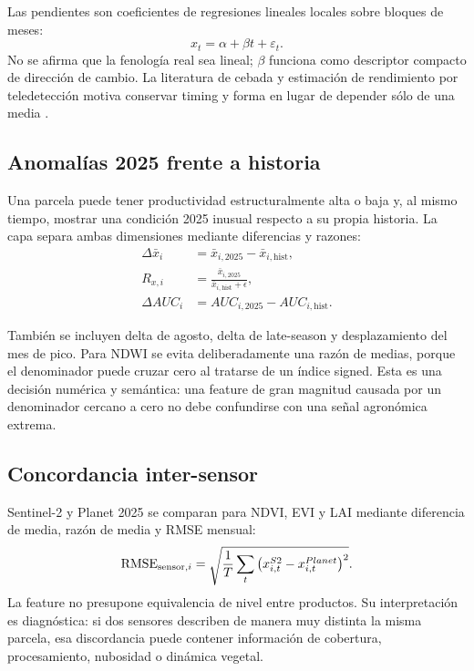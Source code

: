 Las pendientes son coeficientes de regresiones lineales locales sobre bloques de meses:
\[
x_t=\alpha+\beta t+\varepsilon_t.
\]
No se afirma que la fenología real sea lineal; $\beta$ funciona como descriptor compacto de
dirección de cambio. La literatura de cebada y estimación de rendimiento por teledetección
motiva conservar timing y forma en lugar de depender sólo de una media
\citep{Chanev2025,Sharifi2020,Mirosavljevic2018}.

\subsection{Anomalías 2025 frente a historia}

Una parcela puede tener productividad estructuralmente alta o baja y, al mismo tiempo, mostrar
una condición 2025 inusual respecto a su propia historia. La capa separa ambas dimensiones
mediante diferencias y razones:
\begin{align}
\Delta\bar x_i
&=
\bar x_{i,2025}-\bar x_{i,\mathrm{hist}},\\
R_{x,i}
&=
\frac{\bar x_{i,2025}}
{\bar x_{i,\mathrm{hist}}+\epsilon},\\
\Delta AUC_i
&=
AUC_{i,2025}-AUC_{i,\mathrm{hist}}.
\end{align}

También se incluyen delta de agosto, delta de late-season y desplazamiento del mes de pico.
Para NDWI se evita deliberadamente una razón de medias, porque el denominador puede cruzar
cero al tratarse de un índice signed. Esta es una decisión numérica y semántica: una feature
de gran magnitud causada por un denominador cercano a cero no debe confundirse con una señal
agronómica extrema.

\subsection{Concordancia inter-sensor}

Sentinel-2 y Planet 2025 se comparan para NDVI, EVI y LAI mediante diferencia de media,
razón de media y RMSE mensual:
\begin{equation}
\operatorname{RMSE}_{\mathrm{sensor},i}
=
\sqrt{
\frac{1}{T}\sum_t
\left(x^{S2}_{i,t}-x^{Planet}_{i,t}\right)^2
}.
\label{eq:sensor-rmse}
\end{equation}
La feature no presupone equivalencia de nivel entre productos. Su interpretación es
diagnóstica: si dos sensores describen de manera muy distinta la misma parcela, esa
discordancia puede contener información de cobertura, procesamiento, nubosidad o dinámica
vegetal.

